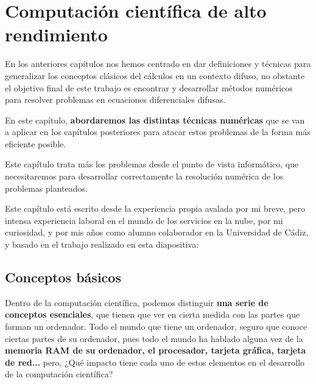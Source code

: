 \chapter{Computación científica de alto rendimiento}
En los anteriores capítulos nos hemos centrado en dar definiciones y técnicas para generalizar los conceptos clásicos del cálculos en un contexto difuso, no obstante el objetivo final de este trabajo es encontrar y desarrollar métodos numéricos para resolver problemas en ecuaciones diferenciales difusas.

En este capítulo, \textbf{abordaremos las distintas técnicas numéricas} que se van a aplicar en los capítulos posteriores para atacar estos problemas de la forma más eficiente posible. 

Este capítulo trata más los problemas desde el punto de vista informático, que necesitaremos para desarrollar correctamente la resolución numérica de los problemas planteados.

Este capítulo está escrito desde la experiencia propia avalada por mi breve, pero intensa experiencia laboral en el mundo de los servicios en la nube, por mi curiosidad, y por mis años como alumno colaborador en la Universidad de Cádiz, y basado en el trabajo realizado en esta diapositiva: \cite{paralelo}
\section{Conceptos básicos}
Dentro de la computación científica, podemos distinguir \textbf{una serie de conceptos esenciales}, que tienen que ver en cierta medida con las partes que forman un ordenador. Todo el mundo que tiene un ordenador, seguro que conoce ciertas partes de su ordenador, pues todo el mundo ha hablado alguna vez de la \textbf{memoria RAM de su ordenador, el procesador, tarjeta gráfica, tarjeta de red...} pero, ¿Qué impacto tiene cada uno de estos elementos en el desarrollo de la computación científica?

